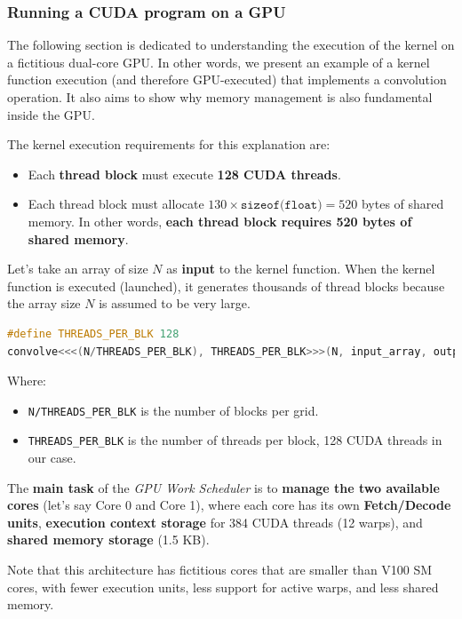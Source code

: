 \subsubsection{Running a CUDA program on a GPU}\label{subsubsection: Running a CUDA program on a GPU}

The following section is dedicated to understanding the execution of the  kernel on a fictitious dual-core GPU. In other words, we present an example of a kernel function execution (and therefore GPU-executed) that implements a convolution operation. It also aims to show why memory management is also fundamental inside the GPU.

\highspace
The kernel execution requirements for this explanation are:
\begin{itemize}
    \item Each \textbf{thread block} must execute \textbf{128 CUDA threads}.
    \item Each thread block must allocate $130 \times \texttt{sizeof(float)} = 520$ bytes of shared memory. In other words, \textbf{each thread block requires 520 bytes of shared memory}.
\end{itemize}
Let's take an array of size $N$ as \textbf{input} to the kernel function. When the kernel function is executed (launched), it generates thousands of thread blocks because the array size $N$ is assumed to be very large.

\begin{lstlisting}[language=C++]
#define THREADS_PER_BLK 128
convolve<<<(N/THREADS_PER_BLK), THREADS_PER_BLK>>>(N, input_array, output_array);
\end{lstlisting}

\noindent
Where:
\begin{itemize}
    \item \texttt{N/THREADS\_PER\_BLK} is the number of blocks per grid.
    \item \texttt{THREADS\_PER\_BLK} is the number of threads per block, 128 CUDA threads in our case.
\end{itemize}
The \textbf{main task} of the \emph{GPU Work Scheduler} is to \textbf{manage the two available cores} (let's say Core 0 and Core 1), where each core has its own \textbf{Fetch/Decode units}, \textbf{execution context storage} for 384 CUDA threads (12 warps), and \textbf{shared memory storage} (1.5 KB).

\highspace
Note that this architecture has fictitious cores that are smaller than V100 SM cores, with fewer execution units, less support for active warps, and less shared memory.


